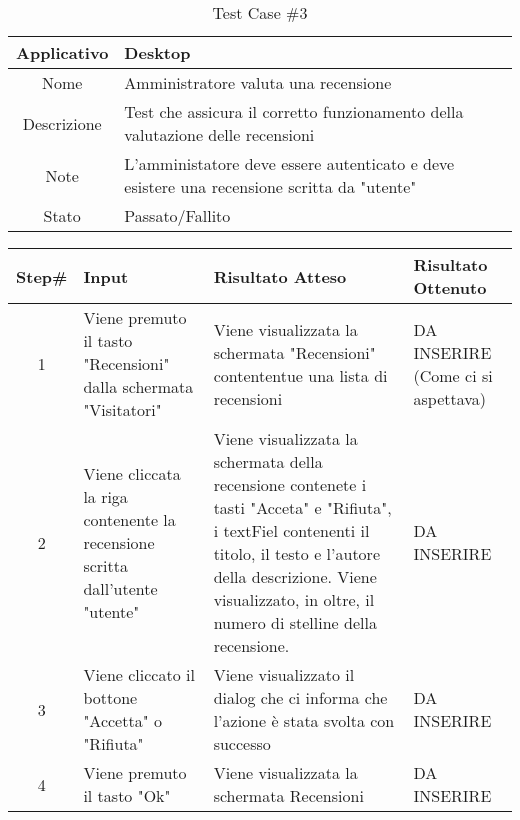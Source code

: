 \pagebreak
\begin{table}[H]
    \footnotesize
    \caption{Test Case \#3}
    \begin{tabularx}{\textwidth}{|c|X|}
        \hline
        Applicativo & Desktop\\
        \hline
        Nome & Amministratore valuta una recensione  \\
        \hline
        Descrizione & Test che assicura il corretto funzionamento della valutazione delle recensioni\\
        \hline
        Note & L'amministatore deve essere autenticato e deve esistere una recensione scritta da "utente"  \\
        \hline
        Stato & Passato/Fallito\\
        \hline

    \end{tabularx}
    \setlength{\tabcolsep}{8pt}
    \renewcommand{\arraystretch}{1.5}
\end{table}

\begin{table}[H]
    \footnotesize
    \begin{tabularx}{\textwidth}{|c|X|X|X|}
        \hline
        Step\# & Input & Risultato Atteso & Risultato Ottenuto \\
        \hline
         1 & Viene premuto il tasto "Recensioni" dalla schermata "Visitatori" 
         & Viene visualizzata la schermata "Recensioni" contententue una lista di recensioni
         &DA INSERIRE (Come ci si aspettava)\\
          \hline
        2 & Viene cliccata la riga contenente la recensione scritta dall'utente "utente"
        & Viene visualizzata la schermata della recensione contenete i tasti "Acceta" e  "Rifiuta", i textFiel contenenti il titolo, il testo e l'autore della descrizione.
        Viene visualizzato, in oltre, il numero di stelline della recensione.
        & DA INSERIRE\\
         \hline 
        3 & Viene cliccato il bottone "Accetta" o "Rifiuta"
         & Viene visualizzato il dialog che ci informa che l'azione è stata svolta con successo
         & DA INSERIRE\\
          \hline
          4 & Viene premuto il tasto "Ok"
         & Viene visualizzata la schermata Recensioni
         & DA INSERIRE\\
          \hline      
    \end{tabularx}
\end{table}
    
       
